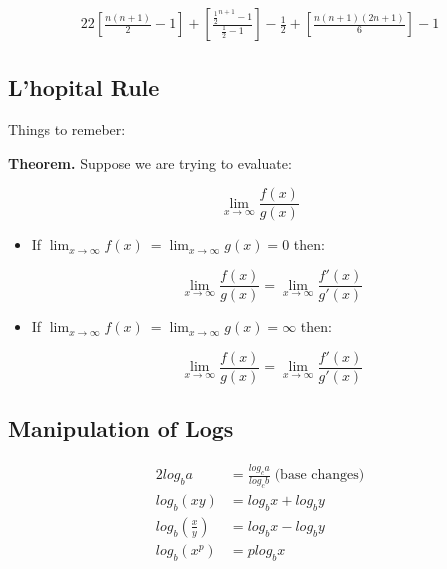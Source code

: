 \documentclass{article}
\begin{document}
\begin{alignat*}{2}
  2\left[\frac{n(n+1)}{2} - 1\right] + \left[\frac{\frac{1}{2}^{n+1} - 1}{\frac{1}{2} -1}\right] - \frac{1}{2} + \left[\frac{n(n+1)(2n+1)}{6}\right] - 1
\end{alignat*}

\subsection{L'hopital Rule}
Things to remeber:

\textbf{Theorem.} Suppose we are trying to evaluate:

\begin{center}
  \[\lim_{x\to\infty}\frac{f(x)}{g(x)}\]
\end{center}
\begin{itemize}
  \item If $\lim_{x\to\infty} f(x)\ = \lim_{x\to\infty} g(x) = 0 $ then:
  \begin{center}
    \[\lim_{x\to\infty}\frac{f(x)}{g(x)} = \lim_{x\to\infty}\frac{f'(x)}{g'(x)} \]

  \end{center}
  \item If $\lim_{x\to\infty} f(x)\ = \lim_{x\to\infty} g(x) = \infty $ then:
  \begin{center}
    \[\lim_{x\to\infty}\frac{f(x)}{g(x)} = \lim_{x\to\infty}\frac{f'(x)}{g'(x)} \]
    
  \end{center}
\end{itemize}
\subsection{Manipulation of Logs}
\begin{alignat*}{2}
  log_b a &= \frac{log_c a}{log_c b} \;\text{(base changes)}\\
  log_b (xy) &= log_b x + log_b y\\
  log_b (\frac{x}{y}) &= log_b{x} - log_b{y}\\
  log_b (x^p) &= p log_b x \\
\end{alignat*}
\end{document}
